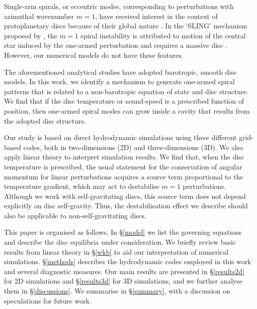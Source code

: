 \documentclass[useAMS,usenatbib]{mn2e}
\begin{document}
Single-arm spirals, or eccentric modes, corresponding to perturbations 
with azimuthal wavenumber $m=1$, have received interest in
the context of protoplanetary discs because of their global nature
\citep{adams89,heemskerk92,laughlin96,tremaine01,papaloizou02,hopkins10}. 
In the `SLING' mechanism proposed by \cite{shu90}, the $m=1$ spiral
instability is attributed to motion of the central star induced by the
one-armed perturbation and requires a massive disc \citep[the former may
have observable consequences, ][]{michael10}. However, our numerical
models do not have these features.   


The aforementioned analytical studies have adopted barotropic, smooth disc models. 
In this work, we identify a mechanism to generate one-armed
spiral patterns that is related to a non-barotropic equation of
state and disc structure. We find that if the disc temperature or
sound-speed is a prescribed function of position, then 
one-armed spiral modes can grow inside a cavity that results from the
adopted disc structure. 

Our study is based on direct hydrodynamic simulations using three
different grid-based codes, both in two-dimensions (2D) and
three-dimensions (3D). We also apply linear
theory to interpret simulation results. We find that, when the disc
temperature is prescribed, the usual statement for the conservation of
angular momentum for linear perturbations acquires a source term
proportional to the temperature gradient, which may act to destabilise
$m=1$ perturbations. Although we work with self-gravitating discs,
this source term does not depend explicitly on disc self-gravity. Thus, the
destabilisation effect we describe should also be applicable to
non-self-gravitating discs. 

This paper is organised as follows. In \S\ref{model} we list the
governing equations and describe the disc equilibria under
consideration. We briefly review basic results from linear theory in
\S\ref{wkb} to aid our interpretation of numerical simulations. 
\S\ref{methods} describes the hydrodynamic codes
employed in this work and several diagnostic measures. Our main results are presented in 
\S\ref{results2d} for 2D simulations and \S\ref{results3d} for 3D
simulations, and we further analyse them in \S\ref{discussions}. 
We summarise in \S\ref{summary}, with a discussion on
speculations for future work. 











\appendix

\end{document}
